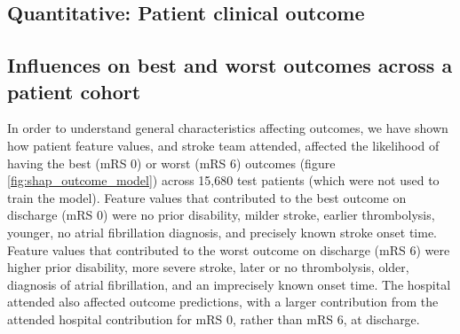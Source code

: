 


\subsection{Quantitative: Patient clinical outcome}


\subsection{Influences on best and worst outcomes across a patient cohort}

In order to understand general characteristics affecting outcomes, we have shown how patient feature values, and stroke team attended, affected the likelihood of having the best (mRS 0) or worst (mRS 6) outcomes (figure \ref{fig:shap_outcome_model}) across 15,680 test patients (which were not used to train the model). Feature values that contributed to the best outcome on discharge (mRS 0) were no prior disability, milder stroke, earlier thrombolysis, younger, no atrial fibrillation diagnosis, and precisely known stroke onset time. Feature values that contributed to the worst outcome on discharge (mRS 6) were higher prior disability, more severe stroke, later or no thrombolysis, older, diagnosis of atrial fibrillation, and an imprecisely known onset time. The hospital attended also affected outcome predictions, with a  larger contribution from the attended hospital contribution for mRS 0, rather than mRS 6, at discharge. 


